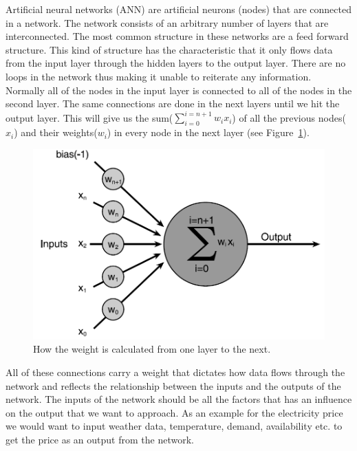 Artificial neural networks (ANN) are artificial neurons (nodes) that are connected in a network. The network consists of an arbitrary number of layers that are interconnected. The most common structure in these networks are a feed forward structure. This kind of structure has the characteristic that it only flows data from the input layer through the hidden layers to the output layer. There are no loops in the network thus making it unable to reiterate any information. Normally all of the nodes in the input layer is connected to all of the nodes in the second layer. The same connections are done in the next layers until we hit the output layer. This will give us the sum($\sum_{i=0}^{i=n+1} w_i x_i$) of all the previous nodes($x_i$) and their weights($w_i$) in every node in the next layer (see Figure~\ref{fig:weight_of_layers}).
\begin{figure}[!ht]
\centering
\includegraphics[width=0.8\linewidth]{billeder/weight_of_layers.png}
\caption{How the weight is calculated from one layer to the next. \cite[P. 251]{buckland2002ai}}
\label{fig:weight_of_layers}
\end{figure}
All of these connections carry a weight that dictates how data flows through the network and reflects the relationship between the inputs and the outputs of the network. The inputs of the network should be all the factors that has an influence on the output that we want to approach. As an example for the electricity price we would want to input weather data, temperature, demand, availability etc. \cite{21} to get the price as an output from the network. 

